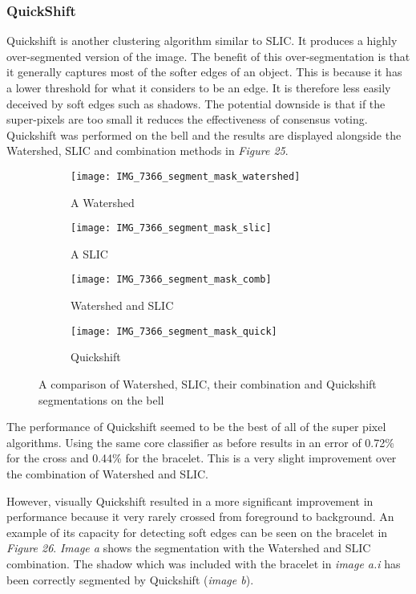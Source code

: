 \documentclass[12pt]{IIBproject}
\begin{document}
\subsubsection{QuickShift}
Quickshift is another clustering algorithm similar to SLIC. It produces a highly over-segmented version of the image. The benefit of this over-segmentation is that it generally captures most of the softer edges of an object. This is because it has a lower threshold for what it considers to be an edge. It is therefore less easily deceived by soft edges such as shadows. The potential downside is that if the super-pixels are too small it reduces the effectiveness of consensus voting. Quickshift was performed on the bell and the results are displayed alongside the Watershed, SLIC and combination methods in \emph{Figure 25}.
\begin{figure}[H]
\centering
\begin{subfigure}{.45\textwidth}
  \centering
  \texttt{[image: IMG\_7366\_segment\_mask\_watershed]}
  \caption{A Watershed}
  \label{fig:sub1}
\end{subfigure}%
\begin{subfigure}{.45\textwidth}
  \centering
  \texttt{[image: IMG\_7366\_segment\_mask\_slic]}
  \caption{A SLIC}
  \label{fig:sub2}
\end{subfigure}
\begin{subfigure}{.45\textwidth}
  \centering
  \texttt{[image: IMG\_7366\_segment\_mask\_comb]}
  \caption{Watershed and SLIC}
  \label{fig:sub2}
\end{subfigure}
\begin{subfigure}{.45\textwidth}
  \centering
  \texttt{[image: IMG\_7366\_segment\_mask\_quick]}
  \caption{Quickshift }
  \label{fig:sub2}
\end{subfigure}
\caption{A comparison of Watershed, SLIC, their combination and Quickshift segmentations on the bell}
\label{fig:test}
\end{figure}



The performance of Quickshift seemed to be the best of all of the super pixel algorithms. Using the same core classifier as before results in an error of 0.72\% for the cross and 0.44\% for the bracelet. This is a very slight improvement over the combination of Watershed and SLIC. 

However, visually Quickshift resulted in a more significant improvement in performance because it very rarely crossed from foreground to background. An example of its capacity for detecting soft edges can be seen on the bracelet in \emph{Figure 26}. \emph{Image a} shows the segmentation with the Watershed and SLIC combination. The shadow which was included with the bracelet in \emph{image a.i} has been correctly segmented by Quickshift (\emph{image b}). 
\end{document}
